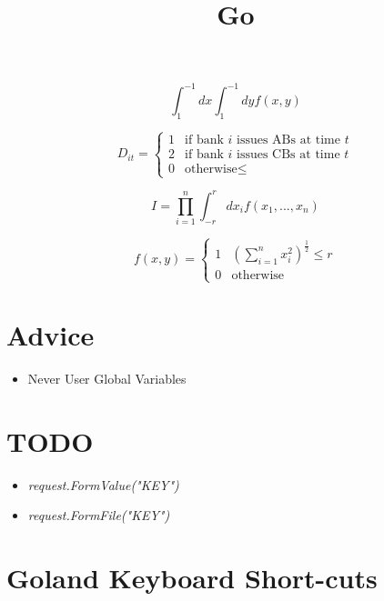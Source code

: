 \documentclass[]{article}
\title{Go}
\author{}
\renewcommand{\it}[1]{\textit{#1}}
\begin{document}
\maketitle

\begin{abstract}

\end{abstract}

\begin{equation}
	\int_{1}^{-1} dx \int_{1}^{-1} dy f(x,y)
\end{equation}

\begin{equation}
D_{it} =
\begin{cases}
1 & \text{if bank $i$ issues ABs at time $t$}\\
2 & \text{if bank $i$ issues CBs at time $t$}\\
0 & \text{otherwise} \leq
\end{cases}       
\end{equation}

\begin{equation}
	I = \prod_{i = 1}^{n} \int_{-r}^{r} dx_i f(x_1, ..., x_n)
\end{equation}

\begin{equation}
f(x,y) =
\begin{cases}
1 &  \left( \sum_{i = 1}^{n} x_i^2 \right)^\frac{1}{2} \leq r\\
0 & \text{otherwise}
\end{cases}       
\end{equation}

\section{Advice} 
\begin{itemize}
	\item Never User Global Variables
\end{itemize}

\section{TODO}
\begin{itemize}
	\item \it{request.FormValue("KEY")}
	\item \it{request.FormFile("KEY")}
\end{itemize}

\section{Goland Keyboard Short-cuts}
\end{document}
